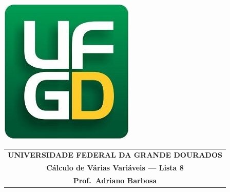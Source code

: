 \documentclass[a4paper,5pt]{amsbook}
\begin{document}
\thispagestyle{empty}
\pagestyle{empty}
\begin{minipage}[h]{0.14\textwidth}
	\includegraphics[scale=0.24]{../../ufgd.png}
\end{minipage}
\begin{minipage}[h]{\textwidth}
\begin{tabular}{c}
{{\bf UNIVERSIDADE FEDERAL DA GRANDE DOURADOS}}\\
{{\bf C\'alculo de V\'arias Vari\'aveis --- Lista 8}}\\
{{\bf Prof.\ Adriano Barbosa}}\\
\end{tabular}
\vspace{-0.45cm}
%
\end{minipage}

\end{document}
